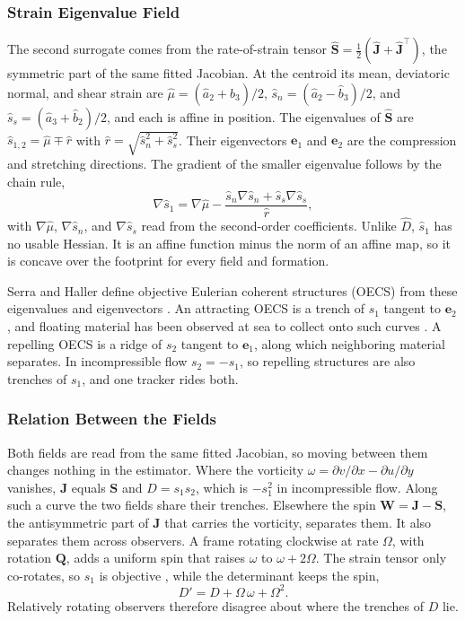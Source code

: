 \documentclass[lettersize,journal]{IEEEtran}
\begin{document}
\subsubsection{Strain Eigenvalue Field}
The second surrogate comes from the rate-of-strain tensor
$\hat{\mathbf{S}} = \tfrac{1}{2}(\hat{\mathbf{J}} + \hat{\mathbf{J}}^{\top})$,
the symmetric part of the same fitted Jacobian.
At the centroid its mean, deviatoric normal, and shear strain are
$\hat{\mu} = (\hat{a}_2 + \hat{b}_3)/2$,
$\hat{s}_n = (\hat{a}_2 - \hat{b}_3)/2$, and
$\hat{s}_s = (\hat{a}_3 + \hat{b}_2)/2$, and each is affine in position.
The eigenvalues of $\hat{\mathbf{S}}$ are
$\hat{s}_{1,2} = \hat{\mu} \mp \hat{r}$ with
$\hat{r} = \sqrt{\hat{s}_n^2 + \hat{s}_s^2}$. Their eigenvectors
$\mathbf{e}_1$ and $\mathbf{e}_2$ are the compression and stretching
directions. The gradient of the smaller eigenvalue follows by the chain
rule,
\begin{equation}
    \nabla\hat{s}_1 = \nabla\hat{\mu}
        - \frac{\hat{s}_n\nabla\hat{s}_n + \hat{s}_s\nabla\hat{s}_s}{\hat{r}},
    \label{eq:grad_s1}
\end{equation}
with $\nabla\hat{\mu}$, $\nabla\hat{s}_n$, and $\nabla\hat{s}_s$ read
from the second-order coefficients. Unlike $\hat{D}$, $\hat{s}_1$ has no
usable Hessian. It is an affine function minus the norm of an affine
map, so it is concave over the footprint for every field and formation.

Serra and Haller define objective Eulerian coherent structures (OECS)
from these eigenvalues and eigenvectors \cite{19}. An attracting OECS is a
trench of $s_1$ tangent to $\mathbf{e}_2$, and floating material has been
observed at sea to collect onto such curves \cite{12}. A repelling OECS is a
ridge of $s_2$ tangent to $\mathbf{e}_1$, along which neighboring
material separates. In incompressible flow $s_2 = -s_1$, so repelling
structures are also trenches of $s_1$, and one tracker rides both.

\subsubsection{Relation Between the Fields}
Both fields are read from the same fitted Jacobian, so moving between
them changes nothing in the estimator. Where the vorticity
$\omega = \partial v/\partial x - \partial u/\partial y$ vanishes,
$\mathbf{J}$ equals $\mathbf{S}$ and $D = s_1 s_2$, which is $-s_1^2$ in
incompressible flow. Along such a curve the two fields share their
trenches. Elsewhere the spin $\mathbf{W} = \mathbf{J} - \mathbf{S}$, the
antisymmetric part of $\mathbf{J}$ that carries the vorticity, separates
them. It also separates them across observers. A frame rotating clockwise at rate
$\Omega$, with rotation $\mathbf{Q}$, adds a uniform spin that raises
$\omega$ to $\omega + 2\Omega$. The strain tensor only co-rotates, so
$s_1$ is objective \cite{19}, while the determinant keeps the spin,
\begin{equation}
    D' = D + \Omega\,\omega + \Omega^2 .
    \label{eq:D_not_objective}
\end{equation}
Relatively rotating observers therefore disagree about where the
trenches of $D$ lie. 
\end{document}

